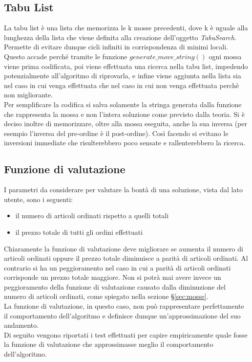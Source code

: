 \subsection{Tabu List}
\label{sec:tabu-list}
\noindent La tabu list è una lista che memorizza le k mosse precedenti, dove k è uguale
alla lunghezza della lista che viene definita alla creazione dell'oggetto \textit{TabuSearch}.\\
Permette di evitare dunque cicli infiniti in corrispondenza
di minimi locali. Questo accade perché tramite le funzione $generate\_move\_string()$ ogni mossa
viene prima codificata, poi viene effettuata una ricerca nella tabu list, impedendo potenzialmente all’algoritmo di riprovarla,
e infine viene aggiunta nella lista sia nel caso in cui venga effettuata che nel caso in cui non venga effettuata perchè non migliorante.\\
Per semplificare la codifica si salva solamente la stringa generata dalla funzione che rappresenta la mossa e non l’intera
soluzione come previsto dalla teoria.
Si è deciso inoltre di memorizzare, oltre alla mossa eseguita, anche la sua inversa
(per esempio l'inversa del pre-ordine è il post-ordine). Così facendo si
evitano le inversioni immediate che risulterebbero poco sensate e rallenterebbero la ricerca.

\subsection{Funzione di valutazione}
\label{sec:funzione-valutazione}
\noindent I parametri da considerare per valutare la bontà di una soluzione, vista dal lato utente,
sono i seguenti:
\begin{itemize}
    \item il numero di articoli ordinati rispetto a quelli totali
    \item il prezzo totale di tutti gli ordini effettuati
\end{itemize}
Chiaramente la funzione di valutazione deve migliorare
se aumenta il numero di articoli ordinati
oppure il prezzo totale diminuisce a parità di articoli ordinati.
Al contrario si ha un peggioramento nel caso in cui a parità di articoli ordinati
corrisponde un prezzo totale maggiore. Non si potrà mai
avere invece un peggioramento della funzione di valutazione causato dalla diminuzione del numero di articoli
ordinati, come spiegato nella sezione §\ref{sec:mosse}.\\
La funzione di valutazione, in questo caso, non può rappresentare perfettamente il
comportamento dell'algoritmo e definisce dunque un'approssimazione del suo andamento.\\
Di seguito vengono riportati i test effettuati per capire empiricamente quale fosse la funzione di valutazione
che approssimasse meglio il comportamento dell'algoritmo.

